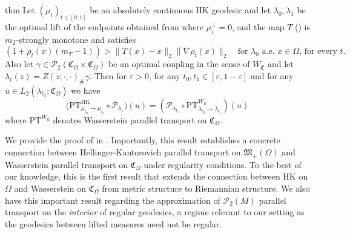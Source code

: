 \documentclass[11pt]{article}
\newcommand{\man}{M}
\begin{document}
\begin{restatable}{thm}{} \label{commutator}
    Let $(\mu_t)_{t \in [0, 1]}$ be an absolutely continuous HK geodesic and let $\lambda_0, \lambda_1$ be the optimal lift of the endpoints obtained from  where $\mu_i^\perp = 0$, and the map $T$ () is $m_T$-strongly monotone and satisfies
    \[(1 + \rho_t(x)(m_T-1)) > \|T(x) - x\|_2 \|\nabla\rho_t(x)\|_2 \quad  \text{for $\lambda_0$ a.e. $x \in \Omega$, for every $t$}.\]
    Also let $\gamma \in \mathcal{P}_2(\mathfrak{C}_\Omega \times \mathfrak{C}_\Omega)$ be an optimal coupling in the sense of $W_\mathfrak{C}$ and let $\lambda_t(z) = Z(z; \cdot, \cdot)_\#\gamma$. Then for $\varepsilon > 0$, for any $t_0, t_1 \in [\varepsilon, 1-\varepsilon]$ and for any $u \in L_2(\lambda_{t_0}; \mathfrak{C}_\Omega)$ we have 
    \[\Big(\text{PT}^{\text{HK}}_{\mu_{t_0} \rightarrow \mu_{t_1}}\circ \mathcal{P}_{\lambda_{\varepsilon}}\Big)(u) = \left(\mathcal{P}_{\lambda_{t_1}}\circ \text{PT}^{W_\mathfrak{C}}_{\lambda_{t_0} \rightarrow \lambda_{t_1}}\right)(u)\]
    where $\text{PT}^{W_\mathfrak{C}}$ denotes Wasserstein parallel transport on $\mathfrak{C}_\Omega$. 
\end{restatable}
We provide the proof of  in . Importantly, this result establishes a concrete connection between Hellinger-Kantorovich parallel transport on $\mathfrak{M}_+(\Omega)$ and Wasserstein parallel transport on $\mathfrak{C}_\Omega$ under regularity conditions. To the best of our knowledge, this is the first result that extends the connection between HK on $\Omega$ and Wasserstein on $\mathfrak{C}_\Omega$ from metric structure to Riemannian structure. We also have this important result regarding the approximation of $\mathcal{P}_2(\man)$ parallel transport on the \textit{interior} of regular geodesics, a regime relevant to our setting as the geodesics between lifted measures need not be regular.
\end{document}
